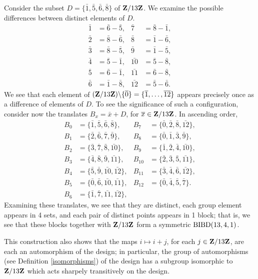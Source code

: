 \documentclass[../../../main]{subfiles}
\begin{document}
Consider the subset $D=\{\bar{1}, \bar{5}, \bar{6}, \bar{8}\}$ of $\mathbf{Z}/13\mathbf{Z}$. We examine the possible differences between distinct elements of $D$.
 \begin{align*}
  \bar{1} &= \bar{6}-\bar{5}, & \bar{7} &= \bar{8}-\bar{1}, \\
  \bar{2} &= \bar{8}-\bar{6}, & \bar{8} &= \bar{1}-\bar{6}, \\
  \bar{3} &= \bar{8}-\bar{5}, & \bar{9} &= \bar{1}-\bar{5}, \\
  \bar{4} &= \bar{5}-\bar{1}, & \bar{10} &= \bar{5}-\bar{8}, \\
  \bar{5} &= \bar{6}-\bar{1}, & \bar{11} &= \bar{6}-\bar{8}, \\
  \bar{6} &= \bar{1}-\bar{8}, & \bar{12} &= \bar{5}-\bar{6}.
 \end{align*}
 We see that each element of $(\mathbf{Z}/13\mathbf{Z}) \backslash \{\overline{0}\} = \{\overline{1}, \dots, \overline{12}\}$ appears precisely once as a difference of elements of $D$. To see the significance of such a configuration, consider now the translates $B_x = \bar{x}+D$, for $\overline{x} \in \mathbf{Z}/13\mathbf{Z}$. In ascending order,
 \begin{align*}
  B_0 &= \{\bar{1},\bar{5},\bar{6},\bar{8}\}, & B_7 &= \{\bar{0},\bar{2},\bar{8},\bar{12}\},\\
  B_1 &= \{\bar{2},\bar{6},\bar{7},\bar{9}\}, & B_8 &= \{\bar{0},\bar{1},\bar{3},\bar{9}\}, \\
  B_2 &= \{\bar{3},\bar{7},\bar{8},\bar{10}\}, & B_9 &= \{\bar{1},\bar{2},\bar{4},\bar{10}\}, \\
  B_3 &= \{\bar{4},\bar{8},\bar{9},\bar{11}\}, & B_{10} &= \{\bar{2},\bar{3},\bar{5},\bar{11}\}, \\
  B_4 &= \{\bar{5},\bar{9},\bar{10},\bar{12}\}, & B_{11} &= \{\bar{3},\bar{4},\bar{6},\bar{12}\}, \\
  B_5 &= \{\bar{0},\bar{6},\bar{10},\bar{11}\}, & B_{12} &= \{\bar{0},\bar{4},\bar{5},\bar{7}\}. \\
  B_6 &= \{\bar{1},\bar{7},\bar{11},\bar{12}\}, &
 \end{align*}
 Examining these translates, we see that they are distinct, each group element appears in 4 sets, and each pair of distinct points appears in 1 block; that is, we see that these blocks together with $\mathbf{Z}/13\mathbf{Z}$ form a symmetric $\text{BIBD}(13,4,1)$. 
 
 This construction also shows that the maps $i \mapsto i+j$, for each $j \in \mathbf{Z}/13\mathbf{Z}$, are each an automorphism of the design; in particular, the group of automorphisms (see Definition \ref{isomorphisms}) of the design has a subgroup isomorphic to $\mathbf{Z}/13\mathbf{Z}$ which acts sharpely transitively on the design.
 
\end{document}
